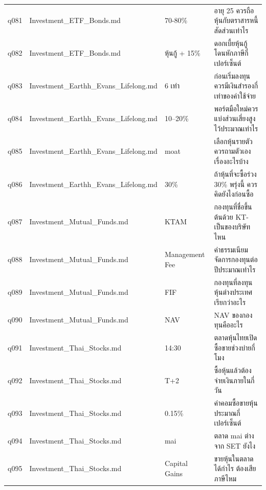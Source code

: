 \documentclass[11pt,a4paper]{article}
\begin{document}
{\begin{longtable}{lp{3.6cm}p{3.4cm}p{6.3cm}}
q081 & Investment\_\allowbreak{}ETF\_\allowbreak{}Bonds.md & 70-80\% & {\thaifont อายุ }25 {\thaifont ควรถือหุ้นกับตราสารหนี้สัดส่วนเท่าไร} \\
q082 & Investment\_\allowbreak{}ETF\_\allowbreak{}Bonds.md & {\thaifont หุ้นกู้ }+ 15\% & {\thaifont ดอกเบี้ยหุ้นกู้โดนหักภาษีกี่เปอร์เซ็นต์} \\
q083 & Investment\_\allowbreak{}Earthh\_\allowbreak{}Evans\_\allowbreak{}Lifelong.md & 6 {\thaifont เท่า} & {\thaifont ก่อนเริ่มลงทุนควรมีเงินสำรองกี่เท่าของค่าใช้จ่าย} \\
q084 & Investment\_\allowbreak{}Earthh\_\allowbreak{}Evans\_\allowbreak{}Lifelong.md & 10--20\% & {\thaifont พอร์ตมือใหม่ควรแบ่งส่วนเสี่ยงสูงไว้ประมาณเท่าไร} \\
q085 & Investment\_\allowbreak{}Earthh\_\allowbreak{}Evans\_\allowbreak{}Lifelong.md & moat & {\thaifont เลือกหุ้นรายตัวควรถามตัวเองเรื่องอะไรบ้าง} \\
q086 & Investment\_\allowbreak{}Earthh\_\allowbreak{}Evans\_\allowbreak{}Lifelong.md & 30\% & {\thaifont ถ้าหุ้นที่จะซื้อร่วง }30\% {\thaifont พรุ่งนี้ ควรคิดยังไงก่อนซื้อ} \\
q087 & Investment\_\allowbreak{}Mutual\_\allowbreak{}Funds.md & KTAM & {\thaifont กองทุนที่ชื่อขึ้นต้นด้วย }KT- {\thaifont เป็นของบริษัทไหน} \\
q088 & Investment\_\allowbreak{}Mutual\_\allowbreak{}Funds.md & Management Fee & {\thaifont ค่าธรรมเนียมจัดการกองทุนต่อปีประมาณเท่าไร} \\
q089 & Investment\_\allowbreak{}Mutual\_\allowbreak{}Funds.md & FIF & {\thaifont กองทุนที่ลงทุนหุ้นต่างประเทศเรียกว่าอะไร} \\
q090 & Investment\_\allowbreak{}Mutual\_\allowbreak{}Funds.md & NAV & NAV {\thaifont ของกองทุนคืออะไร} \\
q091 & Investment\_\allowbreak{}Thai\_\allowbreak{}Stocks.md & 14:30 & {\thaifont ตลาดหุ้นไทยเปิดซื้อขายช่วงบ่ายกี่โมง} \\
q092 & Investment\_\allowbreak{}Thai\_\allowbreak{}Stocks.md & T+2 & {\thaifont ซื้อหุ้นแล้วต้องจ่ายเงินภายในกี่วัน} \\
q093 & Investment\_\allowbreak{}Thai\_\allowbreak{}Stocks.md & 0.15\% & {\thaifont ค่าคอมซื้อขายหุ้นประมาณกี่เปอร์เซ็นต์} \\
q094 & Investment\_\allowbreak{}Thai\_\allowbreak{}Stocks.md & mai & {\thaifont ตลาด }mai {\thaifont ต่างจาก }SET {\thaifont ยังไง} \\
q095 & Investment\_\allowbreak{}Thai\_\allowbreak{}Stocks.md & Capital Gains & {\thaifont ขายหุ้นในตลาดได้กำไร ต้องเสียภาษีไหม} \\

\end{longtable}}
\end{document}
